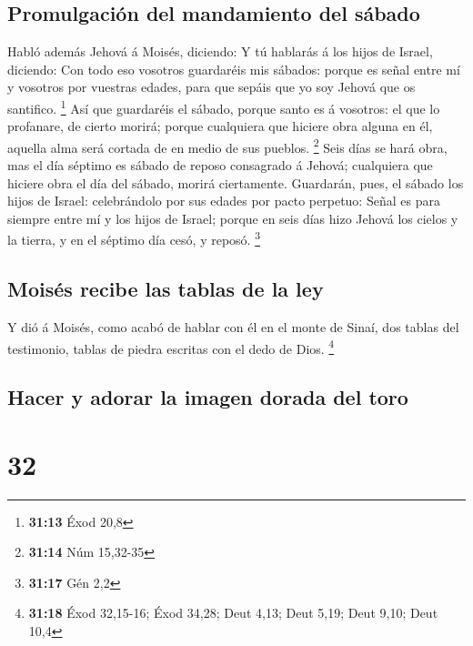 \hypertarget{promulgaciuxf3n-del-mandamiento-del-suxe1bado}{%
\subsection{Promulgación del mandamiento del
sábado}\label{promulgaciuxf3n-del-mandamiento-del-suxe1bado}}

 Habló además Jehová á Moisés, diciendo:  Y tú
hablarás á los hijos de Israel, diciendo: Con todo eso vosotros
guardaréis mis sábados: porque es señal entre mí y vosotros por vuestras
edades, para que sepáis que yo soy Jehová que os santifico. \footnote{\textbf{31:13}
  Éxod 20,8}  Así que guardaréis el sábado, porque santo es
á vosotros: el que lo profanare, de cierto morirá; porque cualquiera que
hiciere obra alguna en él, aquella alma será cortada de en medio de sus
pueblos. \footnote{\textbf{31:14} Núm 15,32-35}  Seis días
se hará obra, mas el día séptimo es sábado de reposo consagrado á
Jehová; cualquiera que hiciere obra el día del sábado, morirá
ciertamente.  Guardarán, pues, el sábado los hijos de
Israel: celebrándolo por sus edades por pacto perpetuo: 
Señal es para siempre entre mí y los hijos de Israel; porque en seis
días hizo Jehová los cielos y la tierra, y en el séptimo día cesó, y
reposó. \footnote{\textbf{31:17} Gén 2,2}

\hypertarget{moisuxe9s-recibe-las-tablas-de-la-ley}{%
\subsection{Moisés recibe las tablas de la
ley}\label{moisuxe9s-recibe-las-tablas-de-la-ley}}

 Y dió á Moisés, como acabó de hablar con él en el monte de
Sinaí, dos tablas del testimonio, tablas de piedra escritas con el dedo
de Dios. \footnote{\textbf{31:18} Éxod 32,15-16; Éxod 34,28; Deut 4,13;
  Deut 5,19; Deut 9,10; Deut 10,4}

\hypertarget{hacer-y-adorar-la-imagen-dorada-del-toro}{%
\subsection{Hacer y adorar la imagen dorada del
toro}\label{hacer-y-adorar-la-imagen-dorada-del-toro}}

\hypertarget{section-31}{%
\section{32}\label{section-31}}

